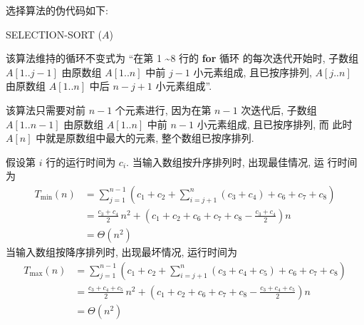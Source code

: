 \documentclass[boxes]{homework}
\begin{document}
\begin{solution}
    选择算法的伪代码如下:

    \begin{algo}
        \caption{SELECTION-SORT ($A$)}
        \label{alg:selection-sort}
    \end{algo}

    该算法维持的循环不变式为 ``在第 1 \textasciitilde 8 行的 \textbf{for} 循环
    的每次迭代开始时, 子数组 $A[1 .. j - 1]$ 由原数组 $A[1 .. n]$ 中前 $j - 1$
    小元素组成, 且已按序排列, $A[j .. n]$ 由原数组 $A[1 .. n]$ 中后 $n - j + 1$
    小元素组成''.

    该算法只需要对前 $n - 1$ 个元素进行, 因为在第 $n - 1$ 次迭代后, 子数组 $A[1
                .. n - 1]$ 由原数组 $A[1 .. n]$ 中前 $n - 1$ 小元素组成, 且已按序排列, 而
    此时 $A[n]$ 中就是原数组中最大的元素, 整个数组已按序排列.

    假设第 $i$ 行的运行时间为 $c_{i}$. 当输入数组按升序排列时, 出现最佳情况, 运
    行时间为
    \begin{equation}
        \label{eq:1}
        \begin{aligned}
            T_{\min}(n) & = \sum_{j = 1}^{n - 1} \left( c_{1} + c_{2} +
            \sum_{i = j + 1}^{n} \left( c_{3} + c_{4}\right) + c_{6} + c_{7} +
            c_{8} \right)                                                     \\
                        & = \frac{c_{3} + c_{4}}{2} \, n^{2} + \left( c_{1} +
            c_{2} + c_{6} + c_{7} + c_{8} - \frac{c_{3} + c_{4}}{2}\right) n  \\
                        & = \Theta(n^{2})
        \end{aligned}
    \end{equation}
    当输入数组按降序排列时, 出现最坏情况, 运行时间为
    \begin{equation}
        \label{eq:2}
        \begin{aligned}
            T_{\max}(n) & = \sum_{j = 1}^{n - 1} \left( c_{1} + c_{2} +
            \sum_{i = j + 1}^{n} \left( c_{3} + c_{4} + c_{5}\right) + c_{6} +
            c_{7} + c_{8}\right)                                           \\
                        & = \frac{ c_{3} + c_{4} + c_{5} }{ 2 } \, n^{2} +
            \left( c_{1} + c_{2} + c_{6} + c_{7} + c_{8} - \frac{ c_{3} + c_{4}
            + c_{5} }{ 2 }\right) n                                        \\
                        & = \Theta(n^{2})
        \end{aligned}
    \end{equation}
\end{solution}
\end{document}
